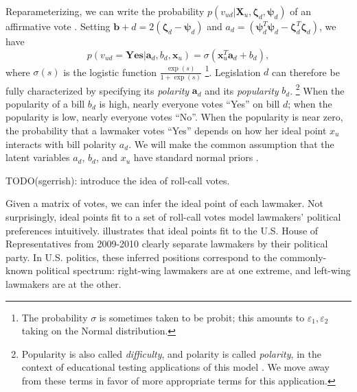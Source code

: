 Reparameterizing, we can write the probability $p(v_{ud} | \bm X_u, \bm \zeta_d,
 \bm \psi_d)$ of an affirmative vote
 \cite{clinton:2004}.  Setting $\bm b+d = 2 (\bm \zeta_d
 - \bm \psi_d )$ and $a_d = (\bm \psi_d^T \bm \psi_d - \bm \zeta_d^T
 \bm \zeta_d )$, we have
\begin{equation}
  p(v_{ud} = \textbf{Yes} | \bm a_d, b_d, \bm x_u) = \sigma ( \bm x_u^T \bm a_d + b_d ),
  \label{eq:trad_ipm}
\end{equation}
where $\sigma(s)$ is the logistic function $\frac{\exp(s)}{1 +
  \exp(s)}$ \footnote{The probability $\sigma$ is sometimes taken to
  be probit; this amounts to $\varepsilon_1, \varepsilon_2$ taking on
  the Normal distribution.}.  Legislation $d$ can therefore be fully
characterized by specifying its \emph{polarity} $\bm a_d$ and its
\emph{popularity} $b_d$. \footnote{Popularity is also called
  \emph{difficulty}, and polarity is called \emph{polarity}, in the
  context of educational testing applications of this model
  \cite{clinton:2004}.  We move away from these terms in favor of more
  appropriate terms for this application.}  When the popularity of a
bill $b_d$ is high, nearly everyone votes ``Yes'' on bill $d$; when
the popularity is low, nearly everyone votes ``No''.  When the
popularity is near zero, the probability that a lawmaker votes ``Yes''
depends on how her ideal point $x_u$ interacts with bill polarity
$a_d$.  We will make the common assumption that the latent variables
$a_d$, $b_d$, and $x_u$ have standard normal priors
\cite{clinton:2004}.

TODO(sgerrish): introduce the idea of roll-call votes.

Given a matrix of votes, we can infer the ideal point of each
lawmaker.  Not surprisingly, ideal points fit to a set of roll-call
votes model lawmakers' political preferences intuitively.  
 illustrates that ideal points
fit to the U.S. House of Representatives from 2009-2010 clearly
separate lawmakers by their political party.  In U.S. politics, these
inferred positions correspond to the commonly-known political
spectrum: right-wing lawmakers are at one extreme, and left-wing
lawmakers are at the other. %



